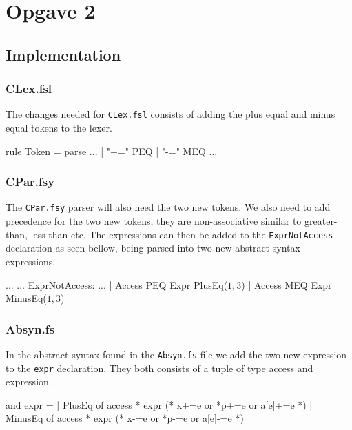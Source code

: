 \section{Opgave 2}
\subsection{Implementation}
\subsubsection*{CLex.fsl}
The changes needed for \texttt{CLex.fsl} consists of adding the plus equal and
minus equal tokens to the lexer.
\begin{fs}
rule Token = parse
...
  | "+="            { PEQ }
  | "-="            { MEQ }
...
\end{fs}
\subsubsection*{CPar.fsy}
The \texttt{CPar.fsy} parser will also need the two new tokens. We also need to
add precedence for the two new tokens, they are non-associative similar to
greater-than, less-than etc. The expressions can then be added to the
\texttt{ExprNotAccess} declaration as seen bellow, being parsed into two new
abstract syntax expressions.
\begin{fs}
...
...
ExprNotAccess:
...
  | Access PEQ Expr                     { PlusEq($1, $3)      } 
  | Access MEQ Expr                     { MinusEq($1, $3)     } 

\end{fs}
\subsubsection*{Absyn.fs}
In the abstract syntax found in the \texttt{Absyn.fs} file we add the two new
expression to the \texttt{expr} declaration. They both consists of a tuple of
type access and expression.
\begin{fs}
and expr =                                                         
  | PlusEq of access * expr          (* x+=e or *p+=e or a[e]+=e    *)
  | MinusEq of access * expr         (* x-=e or *p-=e or a[e]-=e    *)
\end{fs}

